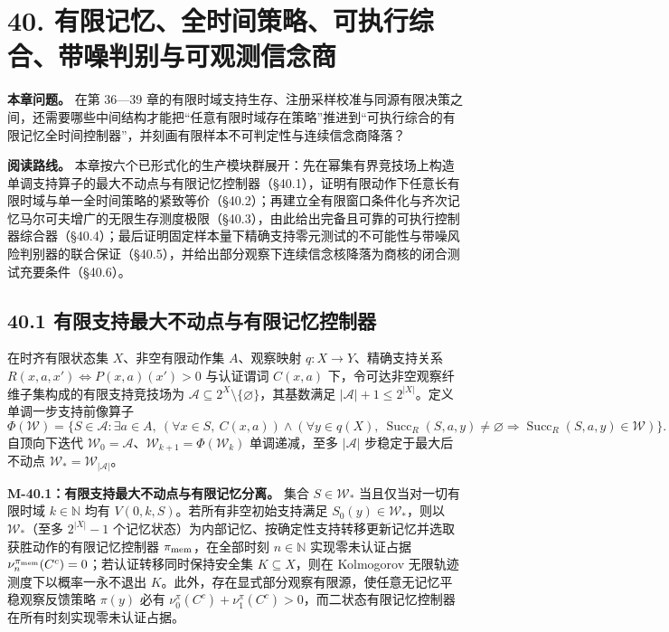 \documentclass[
  11pt,
  oneside]{book}
\begin{document}
\chapter{40. 有限记忆、全时间策略、可执行综合、带噪判别与可观测信念商}\label{ch-40}

\textbf{本章问题。} 在第 36---39 章的有限时域支持生存、注册采样校准与同源有限决策之间，还需要哪些中间结构才能把``任意有限时域存在策略''推进到``可执行综合的有限记忆全时间控制器''，并刻画有限样本不可判定性与连续信念商降落？

\textbf{阅读路线。} 本章按六个已形式化的生产模块群展开：先在幂集有界竞技场上构造单调支持算子的最大不动点与有限记忆控制器（§40.1），证明有限动作下任意长有限时域与单一全时间策略的紧致等价（§40.2）；再建立全有限窗口条件化与齐次记忆马尔可夫增广的无限生存测度极限（§40.3），由此给出完备且可靠的可执行控制器综合器（§40.4）；最后证明固定样本量下精确支持零元测试的不可能性与带噪风险判别器的联合保证（§40.5），并给出部分观察下连续信念核降落为商核的闭合测试充要条件（§40.6）。

\section{40.1 有限支持最大不动点与有限记忆控制器}\label{ux6709ux9650ux652fux6301ux6700ux5927ux4e0dux52a8ux70b9ux4e0eux6709ux9650ux8bb0ux5fc6ux63a7ux5236ux5668}

在时齐有限状态集 \(X\)、非空有限动作集 \(A\)、观察映射 \(q:X\to Y\)、精确支持关系 \(R(x,a,x')\iff P(x,a)(x')>0\) 与认证谓词 \(C(x,a)\) 下，令可达非空观察纤维子集构成的有限支持竞技场为 \(\mathcal A\subseteq 2^X\setminus\{\varnothing\}\)，其基数满足 \(|\mathcal A|+1\le 2^{|X|}\)。定义单调一步支持前像算子 \[\Phi(\mathcal W)=\bigl\{S\in\mathcal A:\exists a\in A,\ (\forall x\in S,\ C(x,a))\wedge(\forall y\in q(X),\ \operatorname{Succ}_R(S,a,y)\neq\varnothing\Rightarrow\operatorname{Succ}_R(S,a,y)\in\mathcal W)\bigr\}.\] 自顶向下迭代 \(\mathcal W_0=\mathcal A\)、\(\mathcal W_{k+1}=\Phi(\mathcal W_k)\) 单调递减，至多 \(|\mathcal A|\) 步稳定于最大后不动点 \(\mathcal W_*=\mathcal W_{|\mathcal A|}\)。

\hypertarget{m-40-1}{}\label{m-40-1}

\textbf{M-40.1：有限支持最大不动点与有限记忆分离。} 集合 \(S\in\mathcal W_*\) 当且仅当对一切有限时域 \(k\in\mathbb N\) 均有 \(V(0,k,S)\)。若所有非空初始支持满足 \(S_0(y)\in\mathcal W_*\)，则以 \(\mathcal W_*\)（至多 \(2^{|X|}-1\) 个记忆状态）为内部记忆、按确定性支持转移更新记忆并选取获胜动作的有限记忆控制器 \(\pi_{\rm mem}\)，在全部时刻 \(n\in\mathbb N\) 实现零未认证占据 \(\nu_n^{\pi_{\rm mem}}(C^c)=0\)；若认证转移同时保持安全集 \(K\subseteq X\)，则在 Kolmogorov 无限轨迹测度下以概率一永不退出 \(K\)。此外，存在显式部分观察有限源，使任意无记忆平稳观察反馈策略 \(\pi(y)\) 必有 \(\nu_0^\pi(C^c)+\nu_1^\pi(C^c)>0\)，而二状态有限记忆控制器在所有时刻实现零未认证占据。
\end{document}
